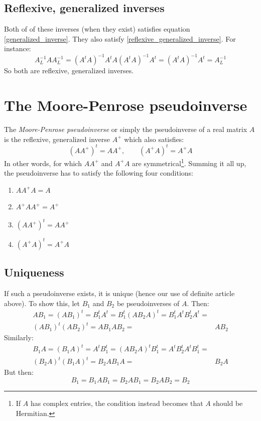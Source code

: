 \documentclass[12pt, a4paper]{article}
\numberwithin{equation}{section}
\begin{document}
\subsection{Reflexive, generalized inverses}
Both of of these inverses (when they exist) satisfies equation \ref{generalized_inverse}. They also satisfy \ref{reflexive_generalized_inverse}. For instance:
\begin{equation}
A^{-1}_L AA^{-1}_L=(A^t A)^{-1}A^t A(A^t A)^{-1}A^t=(A^t A)^{-1}A^t=A^{-1}_L
\end{equation}
So both are reflexive, generalized inverses.

\section{The Moore-Penrose pseudoinverse}
The \textit{Moore-Penrose pseudoinverse} or simply the pseudoinverse of a real matrix $A$ is the reflexive, generalized inverse $A^+$ which also satisfies:
\begin{equation}
\label{moore-penrose}
(AA^+)^t=AA^+,\qquad(A^+ A)^t=A^+ A
\end{equation}
In other words, for which $AA^+$ and $A^+ A$ are symmetrical\footnote{If $A$ has complex entries, the condition instead becomes that $A$ should be Hermitian.}. Summing it all up, the pseudoinverse has to satisfy the following four conditions:
\begin{enumerate}
\item $AA^+ A=A$
\item $A^+ AA^+=A^+$
\item $(AA^+)^t=AA^+$
\item $(A^+ A)^t=A^+ A$
\end{enumerate}
\subsection{Uniqueness}
If such a pseudoinverse exists, it is unique (hence our use of definite article above). To show this, let $B_1$ and $B_2$ be pseudoinverses of $A$. Then:
\begin{align}
AB_1=(AB_1)^t=B_1^t A^t=B_1^t(AB_2 A)^t=B_1^t A^t B_2^t A^t=&\\
(AB_1)^t(AB_2)^t=AB_1 AB_2=&AB_2
\end{align}
Similarly:
\begin{align}
B_1A=(B_1A)^t=A^t B_1^t=(AB_2 A)^t B_1^t=A^t B_2^t A^t B_1^t=&\\
(B_2 A)^t(B_1 A)^t=B_2 A B_1 A=&B_2 A
\end{align}
But then:
\begin{equation}
B_1=B_1 AB_1=B_2 AB_1=B_2 AB_2=B_2
\end{equation}
\end{document}

